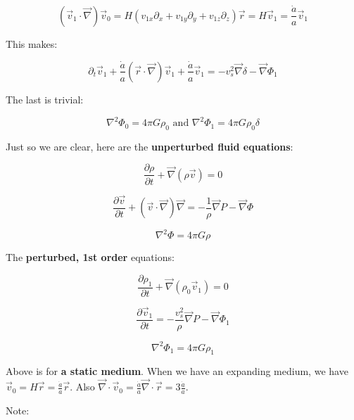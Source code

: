 \documentclass{article}
\newcommand{\be}{\begin{equation}}
\newcommand{\ee}{\end{equation}}
\begin{document}
\be
\left(\vec{v}_1 \cdot \vec{\nabla} \right) \vec{v}_0 = H \left(v_{1x} \partial_x + v_{1y} \partial_y + v_{1z} \partial_z\right)\vec{r} = H \vec{v}_1 = \frac{\dot{a}}{a} \vec{v}_1
\ee

This makes:

\be
\boxed{\partial_t \vec{v}_1 + \frac{\dot{a}}{a} \left(\vec{r} \cdot \vec{\nabla}\right)\vec{v}_1 + \frac{\dot{a}}{a}\vec{v}_1 = - v_s^2 \vec{\nabla} \delta - \vec{\nabla} \Phi_1}
\ee

The last is trivial:

\be
\boxed{\nabla^2 \Phi_0 = 4\pi G \rho_0 \text{ and } \nabla^2 \Phi_1 = 4\pi G \rho_0 \delta}
\ee

Just so we are clear, here are the \textbf{unperturbed fluid equations}:

\be
\frac{\partial \rho}{\partial t} + \vec{\nabla} \left(\rho \vec{v}\right) = 0
\ee

\be
\frac{\partial \vec{v}}{\partial t} + \left(\vec{v} \cdot \vec{\nabla}\right)\vec{\nabla} = -\frac{1}{\rho} \vec{\nabla}P - \vec{\nabla}\Phi
\ee

\be
\nabla^2 \Phi = 4\pi G \rho
\ee

The \textbf{perturbed, 1st order} equations:

\be
\frac{\partial \rho_1}{\partial t} + \vec{\nabla} \left(\rho_0 \vec{v}_1\right) = 0
\ee

\be
\frac{\partial \vec{v}_1}{\partial t}  = -\frac{v_s^2}{\rho} \vec{\nabla}P - \vec{\nabla}\Phi_1
\ee

\be
\nabla^2 \Phi_1 = 4\pi G \rho_1
\ee

Above is for \textbf{a static medium}. When we have an expanding medium, we have $\vec{v}_0 = H \vec{r} = \frac{\dot{a}}{a} \vec{r}$. Also $\vec{\nabla} \cdot \vec{v}_0 = \frac{\dot{a}}{a} \vec{\nabla} \cdot \vec{r} = 3 \frac{\dot{a}}{a}$.

Note:
\end{document}
